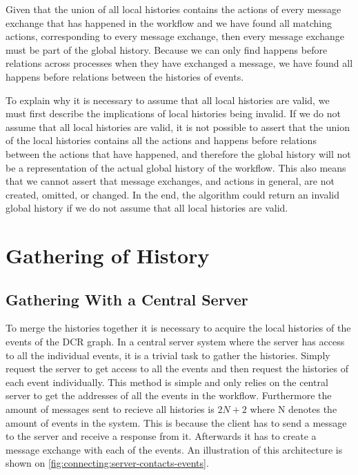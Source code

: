     \newpar Given that the union of all local histories contains the actions of every message exchange that has happened in the workflow and we have found all matching actions, corresponding to every message exchange, then every message exchange must be part of the global history. Because we can only find happens before relations across processes when they have exchanged a message, we have found all happens before relations between the histories of events.
    
    \newpar To explain why it is necessary to assume that all local histories are valid, we must first describe the implications of local histories being invalid. If we do not assume that all local histories are valid, it is not possible to assert that the union of the local histories contains all the actions and happens before relations between the actions that have happened, and therefore the global history will not be a representation of the actual global history of the workflow. This also means that we cannot assert that message exchanges, and actions in general, are not created, omitted, or changed. In the end, the algorithm could return an invalid global history if we do not assume that all local histories are valid.

    \section{Gathering of History}
    \subsection{Gathering With a Central Server}
    To merge the histories together it is necessary to acquire the local histories of the events of the DCR graph. In a central server system where the server has access to all the individual events, it is a trivial task to gather the histories. Simply request the server to get access to all the events and then request the histories of each event individually. This method is simple and only relies on the central server to get the addresses of all the events in the workflow. Furthermore the amount of messages sent to recieve all histories is $2N+2$ where N denotes the amount of events in the system. This is because the client has to send a message to the server and receive a response from it. Afterwards it has to create a message exchange with each of the events. An illustration of this architecture is shown on \autoref{fig:connecting:server-contacts-events}.
    
